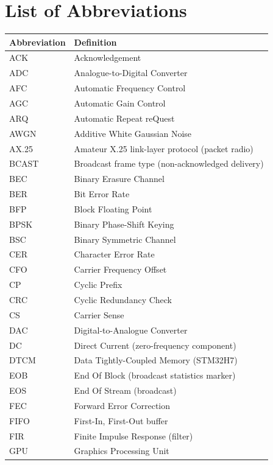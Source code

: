 \section*{List of Abbreviations}

\begin{longtable}{@{}p{3.0cm}p{11.4cm}@{}}
\toprule
\textbf{Abbreviation} & \textbf{Definition} \\
\midrule
ACK    & Acknowledgement \\
ADC    & Analogue-to-Digital Converter \\
AFC    & Automatic Frequency Control \\
AGC    & Automatic Gain Control \\
ARQ    & Automatic Repeat reQuest \\
AWGN   & Additive White Gaussian Noise \\
AX.25  & Amateur X.25 link-layer protocol (packet radio) \\
BCAST  & Broadcast frame type (non-acknowledged delivery) \\
BEC    & Binary Erasure Channel \\
BER    & Bit Error Rate \\
BFP    & Block Floating Point \\
BPSK   & Binary Phase-Shift Keying \\
BSC    & Binary Symmetric Channel \\
CER    & Character Error Rate \\
CFO    & Carrier Frequency Offset \\
CP     & Cyclic Prefix \\
CRC    & Cyclic Redundancy Check \\
CS     & Carrier Sense \\
DAC    & Digital-to-Analogue Converter \\
DC     & Direct Current (zero-frequency component) \\
DTCM   & Data Tightly-Coupled Memory (STM32H7) \\
EOB    & End Of Block (broadcast statistics marker) \\
EOS    & End Of Stream (broadcast) \\
FEC    & Forward Error Correction \\
FIFO   & First-In, First-Out buffer \\
FIR    & Finite Impulse Response (filter) \\
GPU    & Graphics Processing Unit \\

\end{longtable}

